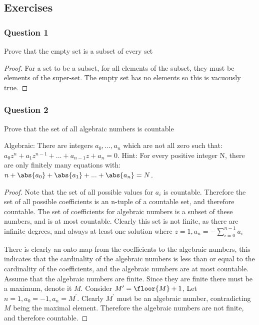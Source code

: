 \documentclass[12pt, letterpaper]{paper}
\begin{document}
\subsection{Exercises}
\label{sec:orgc8f61d7}
\subsubsection{Question 1}
\label{sec:orgb1ab764}
\begin{question}
  Prove that the empty set is a subset of every set
\end{question}
\begin{proof}
  For a set to be a subset, for all elements of the subset, they must
  be elements of the super-set. The empty set has no elements so this
  is vacuously true.
\end{proof}

\subsubsection{Question 2}
\label{sec:org6f8f04c}
\begin{question}
  Prove that the set of all algebraic numbers is countable

  Algebraic: There are integers $a_0, ..., a_n$ which are not all zero
  such that: $a_0 z^n + a_1 z^{n-1} + ... + a_{n-1}z + a_n = 0$.
  Hint: For every positive integer N, there are only finitely many
  equations with: $n + \abs{a_0} + \abs{a_1} + ... + \abs{a_n} = N$.
\end{question}
\begin{proof}
  Note that the set of all possible values for $a_i$ is
  countable. Therefore the set of all possible coefficients is an
  n-tuple of a countable set, and therefore countable. The set of
  coefficients for algebraic numbers is a subset of these numbers, and
  is at most countable. Clearly this set is not finite, as there are
  infinite degrees, and always at least one solution where
  $z=1, a_n = -\sum_{i=0}^{n-1}a_i$
 
  There is clearly an onto map from the coefficients to the algebraic
  numbers, this indicates that the cardinality of the algebraic
  numbers is less than or equal to the cardinality of the
  coefficients, and the algebraic numbers are at most countable.
  Assume that the algebraic numbers are finite. Since they are finite
  there must be a maximum, denote it $M$. Consider
  $M^{\prime} = \floor{M}+1$, Let $n=1, a_0 = -1, a_n =
  M^{\prime}$. Clearly $M^{\prime}$ must be an algebraic number,
  contradicting $M$ being the maximal element. Therefore the algebraic
  numbers are not finite, and therefore countable.


\end{proof}
\end{document}
